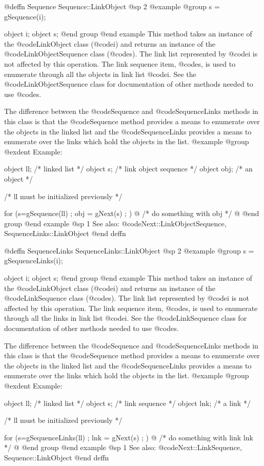 @deffn {Sequence} Sequence::LinkObject
@sp 2
@example
@group
s = gSequence(i);

object  i;
object  s;
@end group
@end example
This method takes an instance of the @code{LinkObject} class (@code{i})
and returns an instance of the @code{LinkObjectSequence} class
(@code{s}).  The link list represented by @code{i} is not affected by
this operation.  The link sequence item, @code{s}, is used to enumerate
through all the objects in link list @code{i}.  See the
@code{LinkObjectSequence} class for documentation of other methods
needed to use @code{s}.

The difference between the @code{Sequence} and @code{SequenceLinks}
methods in this class is that the @code{Sequence} method provides a
means to enumerate over the objects in the linked list and the
@code{SequenceLinks} provides a means to enumerate over the links
which hold the objects in the list.
@example
@group
@exdent Example:

object  ll;  /*  linked list           */
object  s;   /*  link object sequence  */
object  obj; /*  an object             */

/*  ll must be initialized previously  */

for (s=gSequence(ll) ; obj = gNext(s) ; )  @{
        /*  do something with obj  */
@}
@end group
@end example
@sp 1
See also:  @code{Next::LinkObjectSequence, SequenceLinks::LinkObject}
@end deffn














@deffn {SequenceLinks} SequenceLinks::LinkObject
@sp 2
@example
@group
s = gSequenceLinks(i);

object  i;
object  s;
@end group
@end example
This method takes an instance of the @code{LinkObject} class (@code{i})
and returns an instance of the @code{LinkSequence} class
(@code{s}).  The link list represented by @code{i} is not affected by
this operation.  The link sequence item, @code{s}, is used to enumerate
through all the links in link list @code{i}.  See the
@code{LinkSequence} class for documentation of other methods
needed to use @code{s}.

The difference between the @code{Sequence} and @code{SequenceLinks}
methods in this class is that the @code{Sequence} method provides a
means to enumerate over the objects in the linked list and the
@code{SequenceLinks} provides a means to enumerate over the links
which hold the objects in the list.
@example
@group
@exdent Example:

object  ll;  /*  linked list    */
object  s;   /*  link sequence  */
object  lnk; /*  a link         */

/*  ll must be initialized previously  */

for (s=gSequenceLinks(ll) ; lnk = gNext(s) ; )  @{
        /*  do something with link lnk  */
@}
@end group
@end example
@sp 1
See also:  @code{Next::LinkSequence, Sequence::LinkObject}
@end deffn






